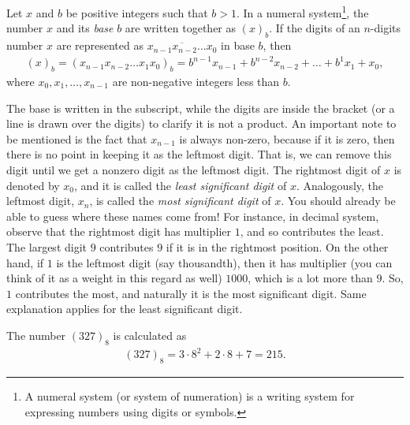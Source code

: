 \documentclass{subfile}
\begin{document}
	\begin{definition}\label{def:base}
		Let $x$ and $b$ be positive integers such that $b>1$. In a numeral system\footnote{A numeral system (or system of numeration) is a writing system for expressing numbers using digits or symbols.}, the number $x$ and its \textit{base} $b$ are written together as $(x)_b$. If the digits of an $n$-digits number $x$ are represented as $\overline{x_{n-1}x_{n-2}\dots x_0}$ in base $b$, then
		\begin{align*}
			(x)_b = (x_{n-1}x_{n-2}\dots x_1x_0)_b=b^{n-1} x_{n-1} + b^{n-2} x_{n-2} + \dots + b^1x_1 + x_0,
		\end{align*}
		where $x_0, x_1, \dots, x_{n-1}$ are non-negative integers less than $b$.
	\end{definition}

	The base is written in the subscript, while the digits are inside the bracket (or a line is drawn over the digits) to clarify it is not a product. An important note to be mentioned is the fact that $x_{n-1}$ is always non-zero, because if it is zero, then there is no point in keeping it as the leftmost digit. That is, we can remove this digit until we get a nonzero digit as the leftmost digit. The rightmost digit of $x$ is denoted by $x_0$, and it is called the \textit{least significant digit} of $x$. Analogously, the leftmost digit, $x_n$, is called the \textit{most significant digit} of $x$. You should already be able to guess where these names come from! For instance, in decimal system, observe that the rightmost digit has multiplier $1$, and so contributes the least. The largest digit $9$ contributes $9$ if it is in the rightmost position. On the other hand, if $1$ is the leftmost digit (say thousandth), then it has multiplier (you can think of it as a weight in this regard as well) $1000$, which is a lot more than $9$. So, $1$ contributes the most, and naturally it is the most significant digit. Same explanation applies for the least significant digit.
	\begin{example}
		The number $(327)_8$ is calculated as
		\begin{align*}
			(327)_8 = 3 \cdot 8^2 + 2 \cdot 8 + 7 = 215.
		\end{align*}
	\end{example}
\end{document}
